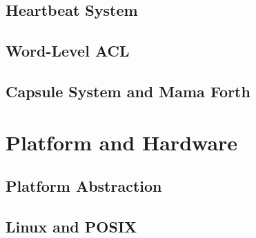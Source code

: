 \chapter{Heartbeat System}







\chapter{Word-Level ACL}


\chapter{Capsule System and Mama Forth}


\part{Platform and Hardware}

\chapter{Platform Abstraction}








\chapter{Linux and POSIX}

